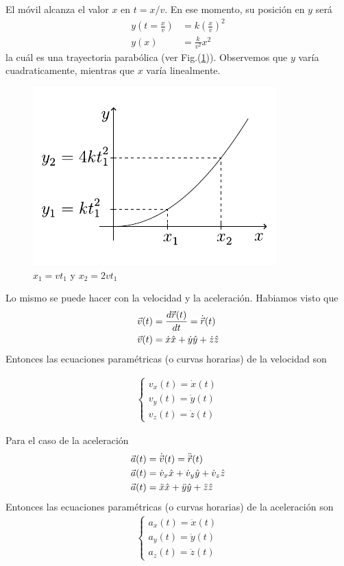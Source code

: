 \begin{example}
\para
El móvil alcanza el valor $x$ en $t=x/v$. En ese momento, su posición en $y$ será
\begin{align*}
y\left(t=\frac{x}{v}\right) &= k\left(\frac{x}{v}\right)^2 \\
y(x) &= \frac{k}{v^2}x^2
\end{align*}
la cuál es una trayectoria parabólica (ver Fig.(\ref{fig:1-17})). Observemos que $y$ varía cuadraticamente, mientras que 
$x$ varía linealmente.
\begin{figure}[htbp]
  \centering
  \includegraphics[]{images/f1-17.pdf}
  \caption{$x_1 = vt_1$ y $x_2 = 2vt_1$}
  \label{fig:1-17}
\end{figure}

\end{example}

Lo mismo se puede hacer con la velocidad y la aceleración. Habiamos visto que
\begin{align*}
  \vec{v}(t) &= \frac{d\skew{-1}\vec{r}(t)}{dt} = \dot{\skew{-1}\vec{r}}(t) \\
  \vec{v}(t) &= \dot{x}\hat{x} + \dot{y}\hat{y} + \dot{z}\hat{z}
\end{align*}
Entonces las ecuaciones paramétricas (o curvas horarias) de la velocidad son

\begin{align*}
  \begin{cases}
    v_x(t) = \dot{x}(t)  \\ 
    v_y(t) = \dot{y}(t) \\
    v_z(t) = \dot{z}(t)
  \end{cases}
\end{align*}

Para el caso de la aceleración
\begin{align*}
\vec{a}(t) &= \dot{\skew{-1}\vec{v}}(t) = \ddot{\skew{-1}\vec{r}}(t) \\
\vec{a}(t) &= \dot{v}_x\hat{x} + \dot{v}_y\hat{y} + \dot{v}_z\hat{z} \\
\vec{a}(t) &= \ddot{x}\hat{x} + \ddot{y}\hat{y} + \ddot{z}\hat{z}
\end{align*}
Entonces las ecuaciones paramétricas (o curvas horarias) de la aceleración son
\begin{align*}
\begin{cases}
a_x(t) = \ddot{x}(t) \\ 
a_y(t) = \ddot{y}(t)\\
a_z(t) = \ddot{z}(t)
\end{cases}
\end{align*}

